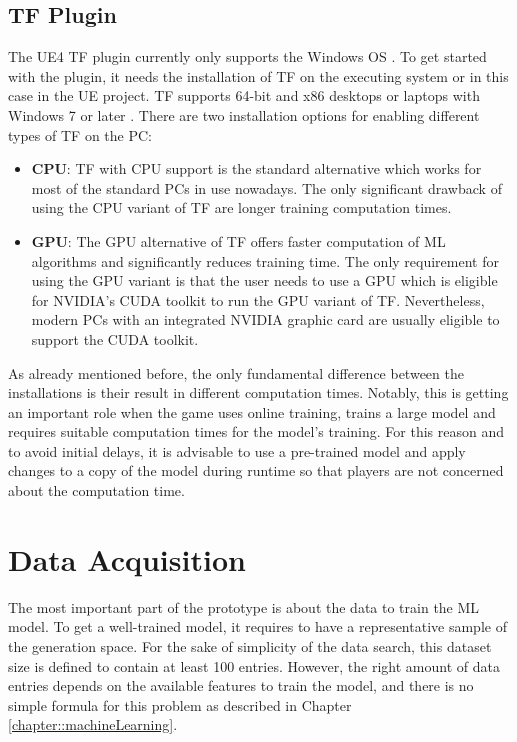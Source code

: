 \documentclass[MGS,Master,english]{twbook}%
\begin{document}
\subsection{\acl{TF} Plugin}
The UE4 \ac{TF} plugin currently only supports the Windows OS \cite{ue4::tensorFlowPlugin}. To get started with the plugin, it needs the installation of \ac{TF} on the executing system or in this case in the UE project. \ac{TF} supports 64-bit and x86 desktops or laptops with Windows 7 or later \cite{api::tensorFlow}. There are two installation options for enabling different types of \ac{TF} on the PC:
\begin{itemize}
	\item \textbf{\ac{CPU}}: \ac{TF} with CPU support is the standard alternative which works for most of the standard PCs in use nowadays. The only significant drawback of using the CPU variant of \ac{TF} are longer training computation times.
	\item \textbf{\ac{GPU}}: The GPU alternative of \ac{TF} offers faster computation of ML algorithms and significantly reduces training time. The only requirement for using the GPU variant is that the user needs to use a GPU which is eligible for NVIDIA's CUDA toolkit \cite{nvidia::cudaToolkit} to run the GPU variant of \ac{TF}. Nevertheless, modern PCs with an integrated NVIDIA graphic card are usually eligible to support the CUDA toolkit. 
\end{itemize}

As already mentioned before, the only fundamental difference between the installations is their result in different computation times. Notably, this is getting an important role when the game uses online training, trains a large model and requires suitable computation times for the model's training. For this reason and to avoid initial delays, it is advisable to use a pre-trained model and apply changes to a copy of the model during runtime so that players are not concerned about the computation time.

\section{Data Acquisition}
The most important part of the prototype is about the data to train the ML model. To get a well-trained model, it requires to have a representative sample of the generation space. For the sake of simplicity of the data search, this dataset size is defined to contain at least 100 entries. However, the right amount of data entries depends on the available features to train the model, and there is no simple formula for this problem as described in Chapter \ref{chapter::machineLearning}. 
\end{document}
